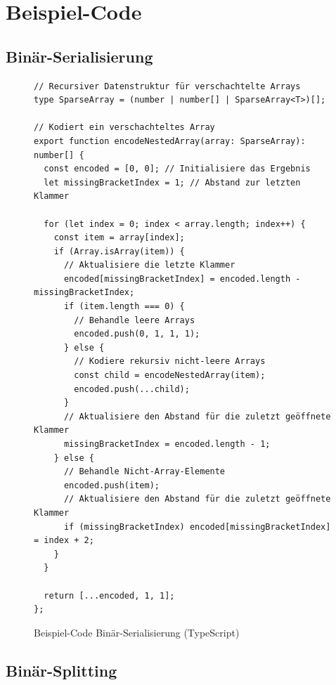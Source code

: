 \documentclass[ngerman]{article}
\begin{document}
\pagebreak

\section{Beispiel-Code}
\subsection{Binär-Serialisierung}
\label{sec:code_nested_encoding}

\begin{figure}[htbp]
  \begin{code}
    \begin{verbatim}
// Recursiver Datenstruktur für verschachtelte Arrays
type SparseArray = (number | number[] | SparseArray<T>)[];

// Kodiert ein verschachteltes Array
export function encodeNestedArray(array: SparseArray): number[] {
  const encoded = [0, 0]; // Initialisiere das Ergebnis
  let missingBracketIndex = 1; // Abstand zur letzten Klammer

  for (let index = 0; index < array.length; index++) {
    const item = array[index];
    if (Array.isArray(item)) {
      // Aktualisiere die letzte Klammer
      encoded[missingBracketIndex] = encoded.length - missingBracketIndex;
      if (item.length === 0) {
        // Behandle leere Arrays
        encoded.push(0, 1, 1, 1);
      } else {
        // Kodiere rekursiv nicht-leere Arrays
        const child = encodeNestedArray(item);
        encoded.push(...child);
      }
      // Aktualisiere den Abstand für die zuletzt geöffnete Klammer
      missingBracketIndex = encoded.length - 1;
    } else {
      // Behandle Nicht-Array-Elemente
      encoded.push(item);
      // Aktualisiere den Abstand für die zuletzt geöffnete Klammer
      if (missingBracketIndex) encoded[missingBracketIndex] = index + 2;
    }
  }

  return [...encoded, 1, 1];
};
    \end{verbatim}
  \end{code}

  \caption{Beispiel-Code Binär-Serialisierung (TypeScript)}
  \label{sec:data_nested_encoding}

\end{figure}

\pagebreak

\subsection{Binär-Splitting}
\label{sec:code_nested_splitting}
\end{document}
